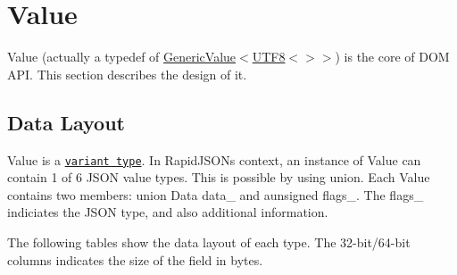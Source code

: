 \hypertarget{md_Cadriciel_Commun_Externe_RapidJSON_doc_internals_Value}{}\section{Value}\label{md_Cadriciel_Commun_Externe_RapidJSON_doc_internals_Value}
{\ttfamily Value} (actually a typedef of {\ttfamily \hyperlink{class_generic_value}{Generic\+Value}$<$\hyperlink{struct_u_t_f8}{U\+T\+F8}$<$$>$$>$}) is the core of D\+OM A\+PI. This section describes the design of it.\hypertarget{md_Cadriciel_Commun_Externe_RapidJSON_doc_internals_DataLayout}{}\subsection{Data Layout}\label{md_Cadriciel_Commun_Externe_RapidJSON_doc_internals_DataLayout}
{\ttfamily Value} is a \href{http://en.wikipedia.org/wiki/Variant_type}{\tt variant type}. In Rapid\+J\+S\+ON\textquotesingle{}s context, an instance of {\ttfamily Value} can contain 1 of 6 J\+S\+ON value types. This is possible by using {\ttfamily union}. Each {\ttfamily Value} contains two members\+: {\ttfamily union Data data\+\_\+} and a{\ttfamily unsigned flags\+\_\+}. The {\ttfamily flags\+\_\+} indiciates the J\+S\+ON type, and also additional information.

The following tables show the data layout of each type. The 32-\/bit/64-\/bit columns indicates the size of the field in bytes.

